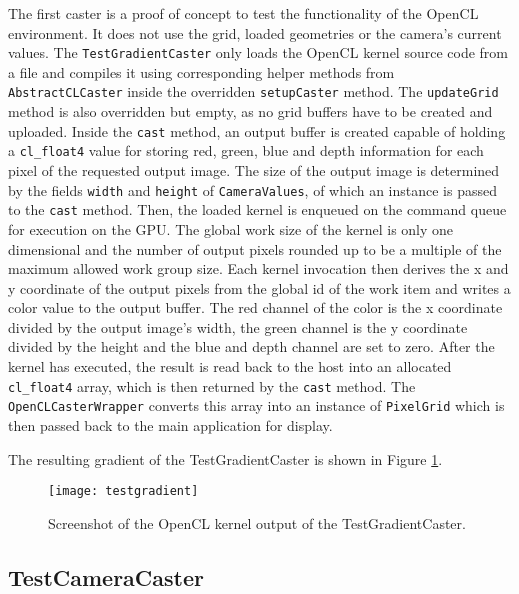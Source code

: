 The first caster is a proof of concept to test the functionality of the OpenCL environment. It does not use the grid, loaded geometries or the camera's current values. The \lstinline!TestGradientCaster! only loads the OpenCL kernel source code from a file and compiles it using corresponding helper methods from \lstinline!AbstractCLCaster! inside the overridden \lstinline!setupCaster! method. The \lstinline!updateGrid! method is also overridden but empty, as no grid buffers have to be created and uploaded. Inside the \lstinline!cast! method, an output buffer is created capable of holding a \lstinline!cl_float4! value for storing red, green, blue and depth information for each pixel of the requested output image. The size of the output image is determined by the fields \lstinline!width! and \lstinline!height! of \lstinline!CameraValues!, of which an instance is passed to the \lstinline!cast! method. Then, the loaded kernel is enqueued on the command queue for execution on the GPU. The global work size of the kernel is only one dimensional and the number of output pixels rounded up to be a multiple of the maximum allowed work group size. Each kernel invocation then derives the x and y coordinate of the output pixels from the global id of the work item and writes a color value to the output buffer. The red channel of the color is the x coordinate divided by the output image's width, the green channel is the y coordinate divided by the height and the blue and depth channel are set to zero. After the kernel has executed, the result is read back to the host into an allocated \lstinline!cl_float4! array, which is then returned by the \lstinline!cast! method. The \lstinline!OpenCLCasterWrapper! converts this array into an instance of \lstinline!PixelGrid! which is then passed back to the main application for display.

The resulting gradient of the TestGradientCaster is shown in Figure \ref{fig:testgradient}.

\begin{figure}
\centering
\texttt{[image: testgradient]}
\caption{Screenshot of the OpenCL kernel output of the TestGradientCaster.}
\label{fig:testgradient}
\end{figure}


\subsection{TestCameraCaster}

